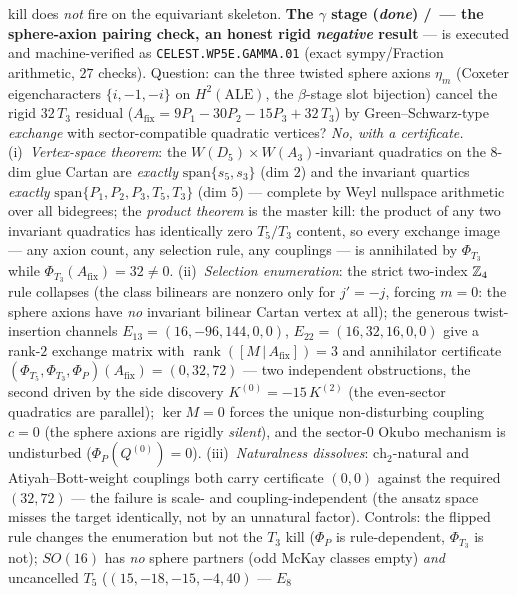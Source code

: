 kill does \emph{not} fire on the equivariant skeleton. \textbf{The $\gamma$ stage (\emph{done})
\mE/\mC\ --- the sphere-axion pairing check, an honest rigid \emph{negative} result} --- is
executed and machine-verified as \texttt{CELEST.WP5E.GAMMA.01}
 (exact sympy/Fraction arithmetic, $27$ checks).
Question: can the three twisted sphere axions $\eta_m$ (Coxeter eigencharacters $\{i,-1,-i\}$ on
$H^2(\mathrm{ALE})$, the $\beta$-stage slot bijection) cancel the rigid $32\,T_3$ residual
($A_{\mathrm{fix}}=9P_1{-}30P_2{-}15P_3{+}32\,T_3$) by Green--Schwarz-type \emph{exchange} with
sector-compatible quadratic vertices? \emph{No, with a certificate.} (i)~\emph{Vertex-space
theorem}: the $W(D_5){\times}W(A_3)$-invariant quadratics on the $8$-dim glue Cartan are
\emph{exactly} $\mathrm{span}\{s_5,s_3\}$ (dim $2$) and the invariant quartics \emph{exactly}
$\mathrm{span}\{P_1,P_2,P_3,T_5,T_3\}$ (dim $5$) --- complete by Weyl nullspace arithmetic over
all bidegrees; the \emph{product theorem} is the master kill: the product of any two invariant
quadratics has identically zero $T_5/T_3$ content, so every exchange image --- any axion count,
any selection rule, any couplings --- is annihilated by $\Phi_{T_3}$ while
$\Phi_{T_3}(A_{\mathrm{fix}})=32\neq0$. (ii)~\emph{Selection enumeration}: the strict two-index
$\mathbb Z_4$ rule collapses (the class bilinears are nonzero only for $j'=-j$, forcing $m=0$: the sphere
axions have \emph{no} invariant bilinear Cartan vertex at all); the generous twist-insertion
channels $E_{13}=(16,-96,144,0,0)$, $E_{22}=(16,32,16,0,0)$ give a rank-$2$ exchange matrix with
$\operatorname{rank}([M\,|\,A_{\mathrm{fix}}])=3$ and annihilator certificate
$(\Phi_{T_5},\Phi_{T_3},\Phi_P)(A_{\mathrm{fix}})=(0,32,72)$ --- two independent obstructions, the
second driven by the side discovery $K^{(0)}=-15\,K^{(2)}$ (the even-sector quadratics are
parallel); $\ker M=0$ forces the unique non-disturbing coupling $c=0$ (the sphere axions are
rigidly \emph{silent}), and the sector-$0$ Okubo mechanism is undisturbed
($\Phi_P(Q^{(0)})=0$). (iii)~\emph{Naturalness dissolves}: $\mathrm{ch}_2$-natural and
Atiyah--Bott-weight couplings both carry certificate $(0,0)$ against the required $(32,72)$ ---
the failure is scale- and coupling-independent (the ansatz space misses the target identically,
not by an unnatural factor). Controls: the flipped rule changes the enumeration but not the
$T_3$ kill ($\Phi_P$ is rule-dependent, $\Phi_{T_3}$ is not); $SO(16)$ has \emph{no} sphere
partners (odd McKay classes empty) \emph{and} uncancelled $T_5$ ($(15,-18,-15,-4,40)$ --- $E_8$
